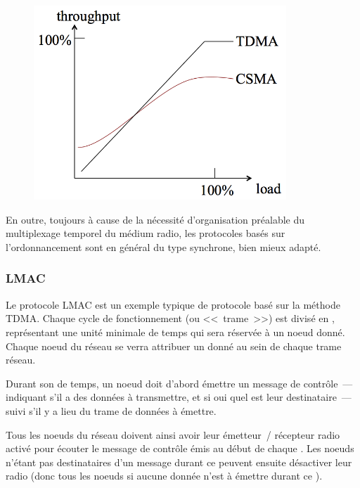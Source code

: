 \begin{figure}[!hbt]
\centering
\includegraphics[width=9.5cm]{images/ch3-tdma-vs-csma.png}
\label{FigTDMAvsCSMA}
\end{figure}

En outre, toujours à cause de la nécessité d'organisation préalable
du multiplexage temporel du médium radio, les protocoles basés sur
l'ordonnancement sont en général du type synchrone, bien mieux adapté.

\subsubsection{LMAC}
\label{ParLMAC}

Le protocole LMAC \cite{LMAC} est un exemple typique de protocole basé
sur la méthode TDMA. Chaque cycle de fonctionnement (ou <<~trame~>>)
est divisé en , représentant une unité minimale de temps
qui sera réservée à un noeud donné. Chaque noeud du réseau se verra
attribuer un  donné au sein de chaque trame réseau.

Durant son  de temps, un noeud doit d'abord émettre un
message de contrôle~--- indiquant s'il a des données à transmettre,
et si oui quel est leur destinataire~--- suivi s'il y a lieu du trame
de données à émettre.

Tous les noeuds du réseau doivent ainsi avoir leur émetteur~/ récepteur
radio activé pour écouter le message de contrôle émis au début de chaque
. Les noeuds n'étant pas destinataires d'un message durant ce
 peuvent ensuite désactiver leur radio (donc tous les
noeuds si aucune donnée n'est à émettre durant ce ).

